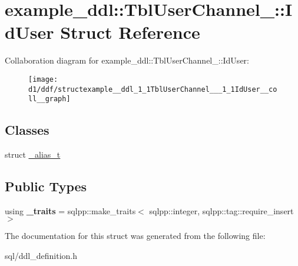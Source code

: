 \hypertarget{structexample__ddl_1_1TblUserChannel___1_1IdUser}{}\section{example\+\_\+ddl\+:\+:Tbl\+User\+Channel\+\_\+\+:\+:Id\+User Struct Reference}
\label{structexample__ddl_1_1TblUserChannel___1_1IdUser}


Collaboration diagram for example\+\_\+ddl\+:\+:Tbl\+User\+Channel\+\_\+\+:\+:Id\+User\+:
\nopagebreak
\begin{figure}[H]
\begin{center}
\leavevmode
\texttt{[image: d1/ddf/structexample\_\_ddl\_1\_1TblUserChannel\_\_\_1\_1IdUser\_\_coll\_\_graph]}
\end{center}
\end{figure}
\subsection*{Classes}
\begin{DoxyCompactItemize}
\item 
struct \hyperlink{structexample__ddl_1_1TblUserChannel___1_1IdUser_1_1__alias__t}{\+\_\+alias\+\_\+t}
\end{DoxyCompactItemize}
\subsection*{Public Types}
\begin{DoxyCompactItemize}
\item 
\hypertarget{structexample__ddl_1_1TblUserChannel___1_1IdUser_a35f994ecd30cdf2159c64afa71c2d2b3}{}using {\bfseries \+\_\+traits} = sqlpp\+::make\+\_\+traits$<$ sqlpp\+::integer, sqlpp\+::tag\+::require\+\_\+insert $>$\label{structexample__ddl_1_1TblUserChannel___1_1IdUser_a35f994ecd30cdf2159c64afa71c2d2b3}

\end{DoxyCompactItemize}


The documentation for this struct was generated from the following file\+:\begin{DoxyCompactItemize}
\item 
sql/ddl\+\_\+definition.\+h\end{DoxyCompactItemize}
